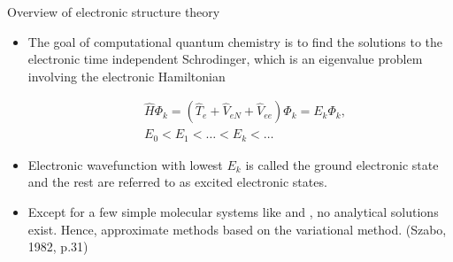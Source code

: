 \begin{frame}{Overview of electronic structure theory}
  \begin{itemize}
    \setlength\itemsep{0.1em}
    \item The goal of computational quantum chemistry is to find the solutions to the
          electronic time independent Schrodinger, which is an eigenvalue problem
          involving the {\color{red}electronic Hamiltonian}

          \begin{align*}
            & \hat{H}\Phi_{k} = (\hat{T}_{e}  + \hat{V}_{eN} + \hat{V}_{ee})\Phi_{k}  = E_{k}\Phi_{k}, \\
            & E_{0} < E_{1} < \ldots < E_{k} < \ldots
          \end{align*}

    \item Electronic wavefunction with lowest $E_{k}$ is called the
          {\color{red}ground} electronic state and the rest are referred to as
          {\color{red}excited} electronic states.

        \item Except for a few simple molecular systems like  and ,
          no analytical solutions exist. Hence, approximate methods
          based on the {\color{red}variational method}. (Szabo, 1982, p.31)
  \end{itemize}





\end{frame}


